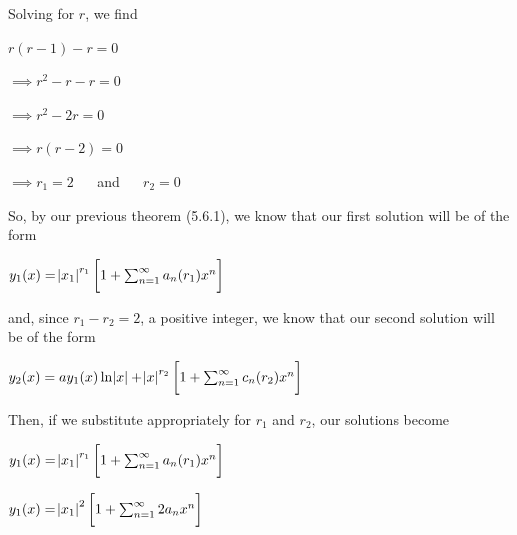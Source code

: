 \documentclass[executivepaper]{article}
\begin{document}
Solving for $r$, we find

\begin{center}

$r(r-1)-r=0$

\vspace{2mm}

$\implies r^2-r-r=0$

\vspace{2mm}

$\implies r^2-2r=0$

\vspace{2mm}

$\implies r(r-2)=0$

\vspace{2mm}

$\implies r_{1}=2$ $\quad$ and $\quad$ $r_{2}=0$

\end{center}

So, by our previous theorem (5.6.1), we know that our first solution will be of the form

\begin{center}

$y_{1}(x)=\abs{x_{1}}^{r_{1}} \bigg[1 + \sum_{n=1}^{\infty} a_{n}(r_{1})x^n\bigg]$

\end{center}

and, since $r_{1}-r_{2}=2$, a positive integer, we know that our second solution will be of the form

\pagebreak

\vspace*{-40mm}

\begin{center}

$y_{2}(x)=ay_{1}(x) \ln{\abs{x}} + \abs{x}^{r_{2}} \bigg[1 + \sum_{n=1}^{\infty} c_{n}(r_{2})x^n\bigg]$

\end{center}

Then, if we substitute appropriately for $r_{1}$ and $r_{2}$, our solutions become

\begin{center}

$y_{1}(x)=\abs{x_{1}}^{r_{1}} \bigg[1 + \sum_{n=1}^{\infty} a_{n}(r_{1})x^n\bigg]$

\vspace{2mm}

$y_{1}(x)=\abs{x_{1}}^{2} \bigg[1 + \sum_{n=1}^{\infty} 2a_{n}x^n\bigg]$

\end{center}
\end{document}
